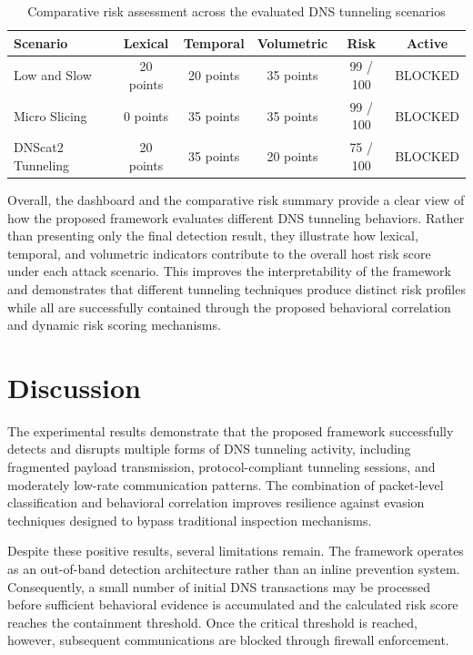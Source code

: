 \documentclass[14pt, a4paper, oneside]{report}
\begin{document}
\begin{table}[H]
\centering
\caption{Comparative risk assessment across the evaluated DNS tunneling scenarios}
\vspace{0.1cm}
\label{tab:risk_comparison}
\bgroup
\normalsize
\renewcommand{\arraystretch}{1.5}
\begin{tabular}{|l|c|c|c|c|c|}
\hline
\textbf{Scenario} & \textbf{Lexical} & \textbf{Temporal} & \textbf{Volumetric} & \textbf{Risk} & \textbf{Active } \\ \hline
Low and Slow & 20 points & 20 points & 35 points & 99 / 100 & BLOCKED \\ \hline
Micro Slicing & 0 points & 35 points & 35 points & 99 / 100 & BLOCKED \\ \hline
DNScat2 Tunneling & 20 points & 35 points & 20 points & 75 / 100 & BLOCKED \\ \hline
\end{tabular}
\egroup
\end{table}

Overall, the dashboard and the comparative risk summary provide a clear view of how the proposed framework evaluates different DNS tunneling behaviors. Rather than presenting only the final detection result, they illustrate how lexical, temporal, and volumetric indicators contribute to the overall host risk score under each attack scenario. This improves the interpretability of the framework and demonstrates that different tunneling techniques produce distinct risk profiles while all are successfully contained through the proposed behavioral correlation and dynamic risk scoring mechanisms.

\section{Discussion}

The experimental results demonstrate that the proposed framework successfully detects and disrupts multiple forms of DNS tunneling activity, including fragmented payload transmission, protocol-compliant tunneling sessions, and moderately low-rate communication patterns. The combination of packet-level classification and behavioral correlation improves resilience against evasion techniques designed to bypass traditional inspection mechanisms.

Despite these positive results, several limitations remain. The framework operates as an out-of-band detection architecture rather than an inline prevention system. Consequently, a small number of initial DNS transactions may be processed before sufficient behavioral evidence is accumulated and the calculated risk score reaches the containment threshold. Once the critical threshold is reached, however, subsequent communications are blocked through firewall enforcement.
\end{document}
